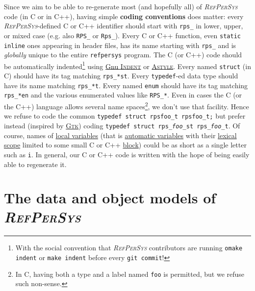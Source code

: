 \documentclass[11pt,a4paper,svgnames]{article}
\newcommand{\RefPerSys}{{\textit{\textsc{RefPerSys}}}}
\begin{document}
 \smallskip

 Since we aim to be able to re-generate most (and hopefully all) of
 {\RefPerSys} code (in C or in C++), having simple \textbf{coding
   conventions} does matter: every \RefPerSys-defined C or C++
 identifier should start with \texttt{rps\_} in lower, upper, or mixed
 case (e.g. also \texttt{RPS\_} or \texttt{Rps\_}). Every C or C++
 function, even \texttt{static inline} ones appearing in header files,
 has its name starting with \texttt{rps\_} and is \emph{globally}
 unique to the entire \texttt{refpersys} program. The C (or C++) code
 should be automatically indented\footnote{With the social convention
 that {\RefPerSys} contributors are running \texttt{omake indent} or
 \texttt{make indent} before every \texttt{git commit}!} using
 \href{https://www.gnu.org/software/indent/}{Gnu \textsc{Indent}} or
 \href{http://astyle.sourceforge.net/}{\textsc{Astyle}}. Every named
 \texttt{struct} (in C) should have its tag matching
 \texttt{rps\_*st}. Every \texttt{typedef}-ed data type should have
 its name matching \texttt{rps\_*t}. Every named \texttt{enum} should
 have its tag matching \texttt{rps\_*en} and the various enumerated
 values like \texttt{RPS\_*}. Even in cases the C (or the C++)
 language allows several name spaces\footnote{In C, having both a type
 and a label named \texttt{foo} is permitted, but we refuse such
 non-sense.}, we don't use that facility. Hence we refuse to code the
 common \texttt{typedef struct rpsfoo\_t rpsfoo\_t;} but prefer
 instead (inspired by \href{http://gtk.org}{\textsc{Gtk}}) coding
 \texttt{typedef struct rps\_\textit{foo}\_st
   rps\_\textit{foo}\_t}. Of course, names of
 \href{https://en.wikipedia.org/wiki/Local\_variable}{local variables}
 (that is
 \href{https://en.wikipedia.org/wiki/Automatic_variable}{automatic
   variables} with their
 \href{https://en.wikipedia.org/wiki/Scope\_(computer\_science)\#Lexical\_scoping}{lexical
   scope} limited to some small C or C++
 \href{https://en.wikipedia.org/wiki/Block\_(programming)}{block})
 could be as short as a single letter such as \texttt{i}. In general,
 our C or C++ code is written with the hope of being easily able to
 regenerate it.
 
\bigskip

\section{The data and object models of \RefPerSys}
\label{sec:dataobjmodel}
\end{document}
